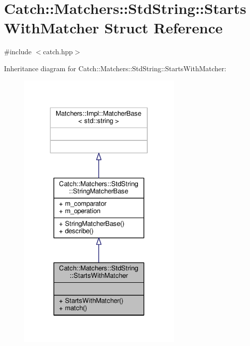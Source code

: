 \hypertarget{struct_catch_1_1_matchers_1_1_std_string_1_1_starts_with_matcher}{\section{Catch\-:\-:Matchers\-:\-:Std\-String\-:\-:Starts\-With\-Matcher Struct Reference}
\label{struct_catch_1_1_matchers_1_1_std_string_1_1_starts_with_matcher}
}


{\ttfamily \#include $<$catch.\-hpp$>$}



Inheritance diagram for Catch\-:\-:Matchers\-:\-:Std\-String\-:\-:Starts\-With\-Matcher\-:
\nopagebreak
\begin{figure}[H]
\begin{center}
\leavevmode
\includegraphics[width=226pt]{struct_catch_1_1_matchers_1_1_std_string_1_1_starts_with_matcher__inherit__graph}
\end{center}
\end{figure}


